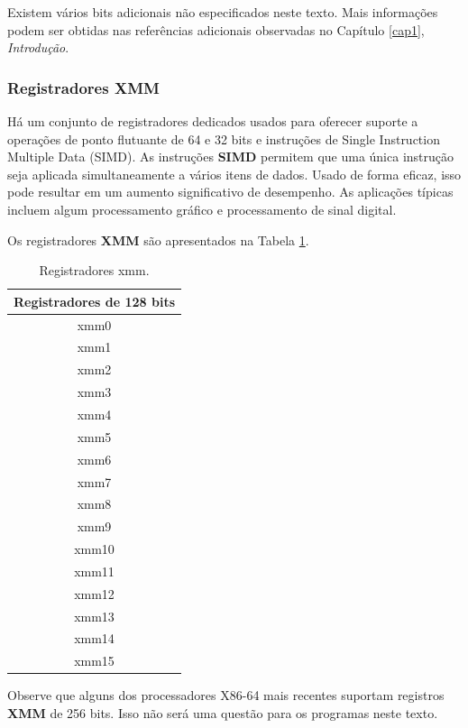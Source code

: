 Existem vários bits adicionais não especificados neste texto. Mais informações podem ser obtidas nas referências adicionais observadas no Capítulo \ref{cap1}, \textit{Introdução}.

\subsubsection{Registradores XMM}
Há um conjunto de registradores dedicados usados para oferecer suporte a operações de ponto flutuante de 64 e 32 bits e instruções de Single Instruction Multiple Data (SIMD). As instruções \textbf{SIMD} permitem que uma única instrução seja aplicada simultaneamente a vários itens de dados. Usado de forma eficaz, isso pode resultar em um aumento significativo de desempenho. As aplicações típicas incluem algum processamento gráfico e processamento de sinal digital.

Os registradores \textbf{XMM} são apresentados na Tabela \ref{tab:xmm}.


\begin{table}[h]
	\centering
	\begin{tabular}{|c|}
		\hline
		\rowcolor[HTML]{C0C0C0} 
		\textbf{Registradores de 128 bits} \\ \hline
		xmm0 \\ \hline
		xmm1 \\ \hline
		xmm2 \\ \hline
		xmm3 \\ \hline
		xmm4 \\ \hline
		xmm5 \\ \hline
		xmm6 \\ \hline
		xmm7 \\ \hline
		xmm8 \\ \hline
		xmm9 \\ \hline
		xmm10 \\ \hline
		xmm11 \\ \hline
		xmm12 \\ \hline
		xmm13 \\ \hline
		xmm14 \\ \hline
		xmm15 \\ \hline
	\end{tabular}
	
	\caption{Registradores xmm.}
	\label{tab:xmm}
\end{table}

Observe que alguns dos processadores X86-64 mais recentes suportam registros \textbf{XMM} de 256 bits. Isso não será uma questão para os programas neste texto.

